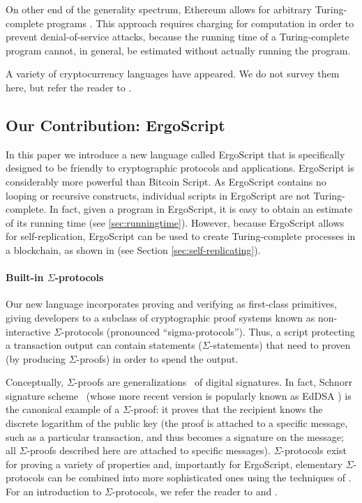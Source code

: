 \documentclass[11pt]{article}
\newcommand{\authnote}[2]{\marginpar{\parbox{\marginparwidth}{\tiny %
  \textsf{#1 {\textcolor{blue}{notes: #2}}}}}%
  \textcolor{blue}{\textbf{\dag}}}
\newcommand{\authnote}[2]{
  \textsf{#1 \textcolor{blue}{: #2}}}
\newcommand{\authnote}[2]{}
\newcommand{\lnote}[1]{{\authnote{\textcolor{orange}{Leo notes}}{#1}}}
\newcommand{\langname}{ErgoScript\xspace}
\begin{document}
On other end of the generality spectrum, Ethereum allows for arbitrary Turing-complete programs \lnote{reference needed for the language}. This approach requires charging for computation in order to prevent denial-of-service attacks, because the running time of a Turing-complete program cannot, in general, be estimated without actually running the program.

A variety of cryptocurrency languages have appeared. We do not survey them here, but refer the reader to \cite[p. 11]{Scilla}. \lnote{if time, can talk about Simplicity, Plutus, TypeCoin, Rholang, Scilla \dots}

\subsection{Our Contribution: \langname}
In this paper we introduce a new language called \langname that is specifically designed to be friendly to cryptographic protocols and applications. \langname is considerably more powerful than Bitcoin Script. As \langname contains no looping or recursive constructs, individual scripts in \langname are not Turing-complete.  In fact, given a program in \langname, it is easy to obtain an estimate of its running time (see \ref{sec:runningtime}). However, because \langname allows for self-replication, \langname can be used to create Turing-complete processes in a blockchain, as shown in \cite{CKM18} (see  Section \ref{sec:self-replicating}).


\paragraph{Built-in $\Sigma$-protocols}
Our new language incorporates proving and verifying as first-class primitives, giving developers to a subclass of cryptographic proof systems known as non-interactive $\Sigma$-protocols (pronounced ``sigma-protocols'').   Thus, a script protecting a transaction output can contain statements ($\Sigma$-statements) that need to proven (by producing $\Sigma$-proofs) in order to spend the output.

Conceptually, $\Sigma$-proofs \cite{Cra96} are generalizations~\cite{CL06} of digital signatures.
In fact, Schnorr signature scheme~\cite{Sch91} (whose more recent version is popularly known as EdDSA \cite{BDLSY12,rfc8032}) is the canonical example of a $\Sigma$-proof: it proves that the recipient knows the discrete logarithm of the public key (the proof is attached to a specific message, such as a particular transaction, and thus becomes a signature on the message; all $\Sigma$-proofs described here are attached to specific messages). $\Sigma$-protocols exist for proving a variety of properties and, importantly for \langname, elementary $\Sigma$-protocols can be combined into more sophisticated ones using the techniques of \cite{CDS94}. For an introduction to $\Sigma$-protocols, we refer the reader to \cite{Dam10} and \cite[Chapter 6]{HL10}.
\end{document}
